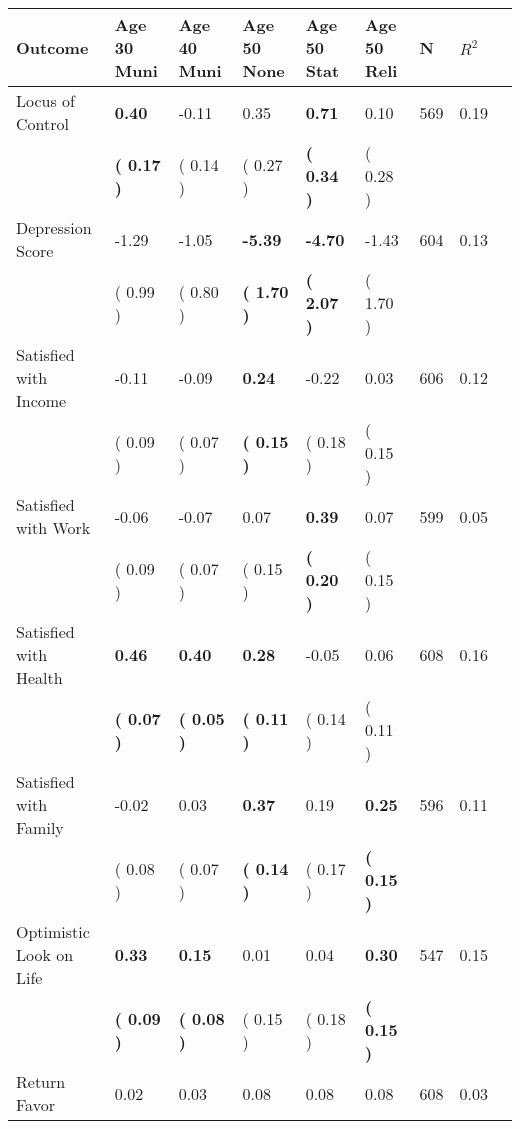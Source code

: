 \begin{tabular}{L{6.2cm} C{1.8cm} C{1.8cm} C{1.8cm} C{1.8cm} C{1.8cm} C{1.8cm} C{0.3cm} C{0.3cm}}
\toprule
 \textbf{Outcome} & \textbf{Age 30 Muni} & \textbf{Age 40 Muni} & \textbf{Age 50 None} & \textbf{Age 50 Stat} & \textbf{Age 50 Reli} & \textbf{N} & \textbf{$ R^2$} \\
\midrule
Locus of Control & \textbf{     0.40} &     -0.11 &      0.35 & \textbf{     0.71} &      0.10  & 569 &       0.19 \\ 
 & \textbf{(     0.17 )} & (     0.14 ) & (     0.27 ) & \textbf{(     0.34 )} & (     0.28 )  & \\
Depression Score &     -1.29 &     -1.05 & \textbf{    -5.39} & \textbf{    -4.70} &     -1.43  & 604 &       0.13 \\ 
 & (     0.99 ) & (     0.80 ) & \textbf{(     1.70 )} & \textbf{(     2.07 )} & (     1.70 )  & \\
Satisfied with Income &     -0.11 &     -0.09 & \textbf{     0.24} &     -0.22 &      0.03  & 606 &       0.12 \\ 
 & (     0.09 ) & (     0.07 ) & \textbf{(     0.15 )} & (     0.18 ) & (     0.15 )  & \\
Satisfied with Work &     -0.06 &     -0.07 &      0.07 & \textbf{     0.39} &      0.07  & 599 &       0.05 \\ 
 & (     0.09 ) & (     0.07 ) & (     0.15 ) & \textbf{(     0.20 )} & (     0.15 )  & \\
Satisfied with Health & \textbf{     0.46} & \textbf{     0.40} & \textbf{     0.28} &     -0.05 &      0.06  & 608 &       0.16 \\ 
 & \textbf{(     0.07 )} & \textbf{(     0.05 )} & \textbf{(     0.11 )} & (     0.14 ) & (     0.11 )  & \\
Satisfied with Family &     -0.02 &      0.03 & \textbf{     0.37} &      0.19 & \textbf{     0.25}  & 596 &       0.11 \\ 
 & (     0.08 ) & (     0.07 ) & \textbf{(     0.14 )} & (     0.17 ) & \textbf{(     0.15 )}  & \\
Optimistic Look on Life & \textbf{     0.33} & \textbf{     0.15} &      0.01 &      0.04 & \textbf{     0.30}  & 547 &       0.15 \\ 
 & \textbf{(     0.09 )} & \textbf{(     0.08 )} & (     0.15 ) & (     0.18 ) & \textbf{(     0.15 )}  & \\
Return Favor &      0.02 &      0.03 &      0.08 &      0.08 &      0.08  & 608 &       0.03 \\ 

\end{tabular}
